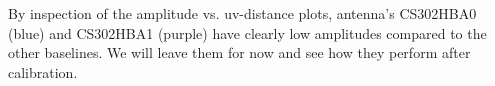 



By inspection of the amplitude vs. uv-distance plots, antenna's CS302HBA0 (blue) and CS302HBA1 (purple) have clearly low amplitudes compared to the other baselines. We will leave them for now and see how they perform after calibration.



% 
% 
% 



